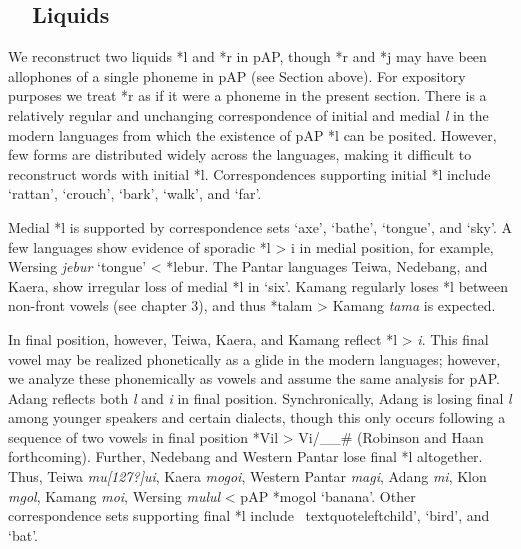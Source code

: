 \subsection[\ \ Liquids]{\ \ Liquids}
\hypertarget{RefHeading49923871885726}{}We reconstruct two liquids *l and *r in pAP, though *r and *j may have been allophones of a single phoneme in pAP (see Section above). For expository purposes we treat *r as if it were a phoneme in the present section. There is a relatively regular and unchanging correspondence of initial and medial \textit{l} in the modern languages from which the existence of pAP *l can be posited. However, few forms are distributed widely across the languages, making it difficult to reconstruct words with initial *l. Correspondences supporting initial *l include {\textquoteleft}rattan{\textquoteright}, {\textquoteleft}crouch{\textquoteright}, {\textquoteleft}bark{\textquoteright}, {\textquoteleft}walk{\textquoteright}, and {\textquoteleft}far{\textquoteright}. 

Medial *l is supported by correspondence sets {\textquoteleft}axe{\textquoteright}, {\textquoteleft}bathe{\textquoteright}, {\textquoteleft}tongue{\textquoteright}, and {\textquoteleft}sky{\textquoteright}. A few languages show evidence of sporadic *l {\textgreater} i in medial position, for example, Wersing \textit{jebur }{\textquoteleft}tongue{\textquoteright} {\textless} *lebur. The Pantar languages Teiwa, Nedebang, and Kaera, show irregular loss of medial *l in {\textquoteleft}six{\textquoteright}. Kamang regularly loses *l between non-front vowels (see chapter 3), and thus *talam {\textgreater} Kamang \textit{ta{\textlengthmark}ma} is expected. 

In final position, however, Teiwa, Kaera, and Kamang reflect *l {\textgreater} \textit{i}. This final vowel may be realized phonetically as a glide in the modern languages; however, we analyze these phonemically as vowels and assume the same analysis for pAP. Adang reflects both \textit{l }and \textit{i} in final position. Synchronically, Adang is losing final \textit{l} among younger speakers and certain dialects, though this only occurs following a sequence of two vowels in final position *Vil {\textgreater} Vi/\_\_\# (Robinson and Haan forthcoming). Further, Nedebang and Western Pantar lose final *l altogether. Thus, Teiwa \textit{mu[127?]ui}, Kaera \textit{mogoi}, Western Pantar \textit{mag{\textlengthmark}i}, Adang \textit{m{\textopeno}}\textit{{\textglotstop}}\textit{{\textopeno}i}, Klon \textit{m{\textschwa}gol}, Kamang \textit{mo{\textlengthmark}i}, Wersing \textit{mulul }{\textless} pAP *mogol {\textquoteleft}banana{\textquoteright}. Other correspondence sets supporting final *l include {\
textquoteleft}child{\textquoteright}, {\textquoteleft}bird{\textquoteright}, and {\textquoteleft}bat{\textquoteright}. 

